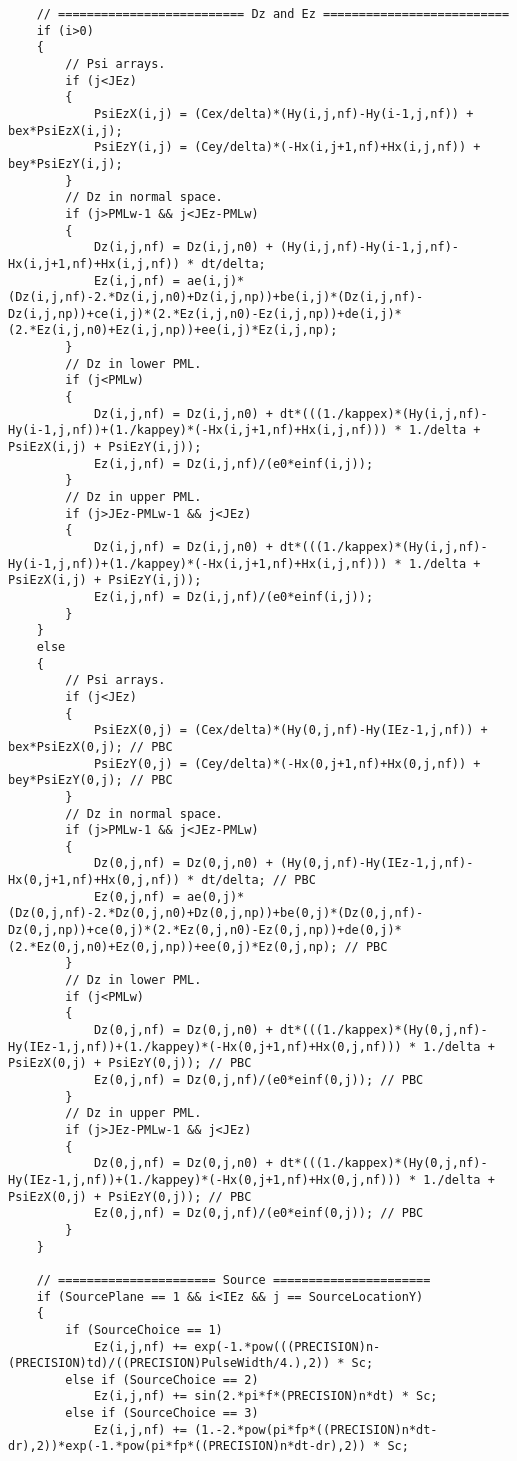 \begin{lstlisting}
	// ========================== Dz and Ez ==========================
	if (i>0)
	{
		// Psi arrays.
		if (j<JEz)
		{
			PsiEzX(i,j) = (Cex/delta)*(Hy(i,j,nf)-Hy(i-1,j,nf)) + bex*PsiEzX(i,j);
			PsiEzY(i,j) = (Cey/delta)*(-Hx(i,j+1,nf)+Hx(i,j,nf)) + bey*PsiEzY(i,j);
		}
		// Dz in normal space.
		if (j>PMLw-1 && j<JEz-PMLw)
		{
			Dz(i,j,nf) = Dz(i,j,n0) + (Hy(i,j,nf)-Hy(i-1,j,nf)-Hx(i,j+1,nf)+Hx(i,j,nf)) * dt/delta;
			Ez(i,j,nf) = ae(i,j)*(Dz(i,j,nf)-2.*Dz(i,j,n0)+Dz(i,j,np))+be(i,j)*(Dz(i,j,nf)-Dz(i,j,np))+ce(i,j)*(2.*Ez(i,j,n0)-Ez(i,j,np))+de(i,j)*(2.*Ez(i,j,n0)+Ez(i,j,np))+ee(i,j)*Ez(i,j,np);
		}
		// Dz in lower PML.
		if (j<PMLw)
		{
			Dz(i,j,nf) = Dz(i,j,n0) + dt*(((1./kappex)*(Hy(i,j,nf)-Hy(i-1,j,nf))+(1./kappey)*(-Hx(i,j+1,nf)+Hx(i,j,nf))) * 1./delta + PsiEzX(i,j) + PsiEzY(i,j));
			Ez(i,j,nf) = Dz(i,j,nf)/(e0*einf(i,j));
		}
		// Dz in upper PML.
		if (j>JEz-PMLw-1 && j<JEz)
		{
			Dz(i,j,nf) = Dz(i,j,n0) + dt*(((1./kappex)*(Hy(i,j,nf)-Hy(i-1,j,nf))+(1./kappey)*(-Hx(i,j+1,nf)+Hx(i,j,nf))) * 1./delta + PsiEzX(i,j) + PsiEzY(i,j));
			Ez(i,j,nf) = Dz(i,j,nf)/(e0*einf(i,j));
		}
	}
	else
	{
		// Psi arrays.
		if (j<JEz)
		{
			PsiEzX(0,j) = (Cex/delta)*(Hy(0,j,nf)-Hy(IEz-1,j,nf)) + bex*PsiEzX(0,j); // PBC
			PsiEzY(0,j) = (Cey/delta)*(-Hx(0,j+1,nf)+Hx(0,j,nf)) + bey*PsiEzY(0,j); // PBC
		}
		// Dz in normal space.
		if (j>PMLw-1 && j<JEz-PMLw)
		{
			Dz(0,j,nf) = Dz(0,j,n0) + (Hy(0,j,nf)-Hy(IEz-1,j,nf)-Hx(0,j+1,nf)+Hx(0,j,nf)) * dt/delta; // PBC
			Ez(0,j,nf) = ae(0,j)*(Dz(0,j,nf)-2.*Dz(0,j,n0)+Dz(0,j,np))+be(0,j)*(Dz(0,j,nf)-Dz(0,j,np))+ce(0,j)*(2.*Ez(0,j,n0)-Ez(0,j,np))+de(0,j)*(2.*Ez(0,j,n0)+Ez(0,j,np))+ee(0,j)*Ez(0,j,np); // PBC
		}
		// Dz in lower PML.
		if (j<PMLw)
		{
			Dz(0,j,nf) = Dz(0,j,n0) + dt*(((1./kappex)*(Hy(0,j,nf)-Hy(IEz-1,j,nf))+(1./kappey)*(-Hx(0,j+1,nf)+Hx(0,j,nf))) * 1./delta + PsiEzX(0,j) + PsiEzY(0,j)); // PBC
			Ez(0,j,nf) = Dz(0,j,nf)/(e0*einf(0,j)); // PBC
		}
		// Dz in upper PML.
		if (j>JEz-PMLw-1 && j<JEz)
		{
			Dz(0,j,nf) = Dz(0,j,n0) + dt*(((1./kappex)*(Hy(0,j,nf)-Hy(IEz-1,j,nf))+(1./kappey)*(-Hx(0,j+1,nf)+Hx(0,j,nf))) * 1./delta + PsiEzX(0,j) + PsiEzY(0,j)); // PBC
			Ez(0,j,nf) = Dz(0,j,nf)/(e0*einf(0,j)); // PBC
		}
	}

	// ====================== Source ======================
	if (SourcePlane == 1 && i<IEz && j == SourceLocationY)
	{
		if (SourceChoice == 1)
			Ez(i,j,nf) += exp(-1.*pow(((PRECISION)n-(PRECISION)td)/((PRECISION)PulseWidth/4.),2)) * Sc;
		else if (SourceChoice == 2)
			Ez(i,j,nf) += sin(2.*pi*f*(PRECISION)n*dt) * Sc;
		else if (SourceChoice == 3)
			Ez(i,j,nf) += (1.-2.*pow(pi*fp*((PRECISION)n*dt-dr),2))*exp(-1.*pow(pi*fp*((PRECISION)n*dt-dr),2)) * Sc;


\end{lstlisting}
